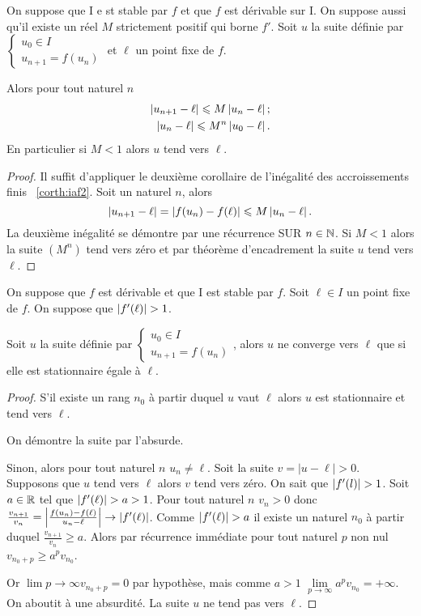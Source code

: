 \begin{prop}
  On suppose que I e st stable par \(f\) et que \(f\) est dérivable sur I. On suppose aussi qu'il existe un réel \(M\) strictement positif qui borne \(f'\). Soit \(u\) la suite définie par \(\begin{cases} u_0 \in I \\ u_{n+1}=f(u_n) \end{cases}\) et \(\ell\) un point fixe de \(f\).

  Alors pour tout naturel \(n\)
  \begin{align}
    \left\lvert u_{n+1}-\ell\right\rvert \leqslant M \left\lvert u_n-\ell\right\rvert; \\
    \left\lvert u_n-\ell\right\rvert \leqslant M^n \left\lvert u_0-\ell\right\rvert.
  \end{align}
  En particulier si \(M < 1\) alors \(u\) tend vers \(\ell\).
\end{prop}
\begin{proof}
  Il suffit d'appliquer le deuxième corollaire de l'inégalité des accroissements finis~
\ref{corth:iaf2}. Soit un naturel \(n\), alors
  \begin{equation}
    \left\lvert u_{n+1}-\ell\right\rvert=\left\lvert f(u_n)-f(\ell)\right\rvert \leqslant M \left\lvert u_n-\ell\right\rvert.
  \end{equation}
  La deuxième inégalité se démontre par une récurrence SUR \(n \in \mathbb{N}\). Si \(M<1\) alors la suite \((M^n)\) tend vers zéro et par théorème d'encadrement la suite \(u\) tend vers \(\ell\).
\end{proof}
\begin{prop}
  On suppose que \(f\) est dérivable et que I est stable par \(f\). Soit \(\ell \in I\) un point fixe de \(f\). On suppose que \(\left\lvert f'(\ell)\right\rvert>1\).

  Soit \(u\) la suite définie par \(\begin{cases} u_0 \in I \\ u_{n+1}=f(u_n) \end{cases}\), alors \(u\) ne converge vers \(\ell\) que si elle est stationnaire égale à \(\ell\).
\end{prop}
\begin{proof}
  S'il existe un rang \(n_0\) à partir duquel \(u\) vaut \(\ell\) alors \(u\) est stationnaire et tend vers \(\ell\).

  On démontre la suite par l'absurde.

  Sinon, alors pour tout naturel \(n\) \(u_n \neq \ell\). Soit la suite \(v=|u-\ell|>0\). Supposons que \(u\) tend vers \(\ell\) alors \(v\) tend vers zéro. On sait que \(\left\lvert f'(l)\right\rvert>1\). Soit \(a \in \mathbb{R}\) tel que \(\left\lvert f'(\ell)\right\rvert>a>1\). Pour tout naturel \(n\) \(v_n>0\) donc \(\frac{v_{n+1}}{v_n} = \left\lvert\frac{f(u_n)-f(\ell)}{u_n-\ell}\right\rvert \to \left\lvert f'(\ell)\right\rvert\). Comme \(\left\lvert f'(\ell)\right\rvert>a\) il existe un naturel \(n_0\) à partir duquel \(\frac{v_{n+1}}{v_n} \geqslant a\). Alors par récurrence immédiate pour tout naturel \(p\) non nul \(v_{n_0+p} \geqslant a^p v_{n_0}\).

Or \(\lim\limits{p \to \infty} v_{n_0+p} = 0\) par hypothèse, mais comme \(a >1\) \(\lim\limits_{p \to \infty} a^p v_{n_0}= + \infty\). On aboutit à une absurdité. La suite \(u\) ne tend pas vers \(\ell\).
\end{proof}

